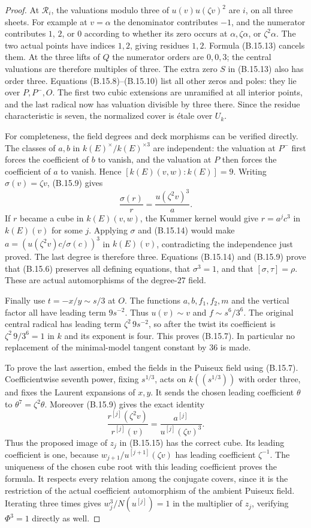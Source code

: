 \begin{proof}
At $\mathcal R_i$, the valuations modulo three of
$u(v)u(\zeta v)^2$ are $i$, on all three sheets.
For example at $v=\alpha$ the denominator contributes
$-1$, and the numerator contributes $1$, $2$, or $0$
according to whether its zero occurs at
$\alpha,\zeta\alpha$, or $\zeta^2\alpha$.
The two actual points have indices $1,2$, giving
residues $1,2$.  Formula (B.15.13) cancels them.
At the three lifts of $Q$ the numerator orders are
$0,0,3$; the
central valuations are therefore multiples of three.
The extra zero $S$ in (B.15.13) also has order three.
Equations (B.15.8)--(B.15.10) list all other zeros and
poles: they lie over $P,P^-,O$.  The first two cubic
extensions are unramified at all interior points, and
the last radical now has valuation divisible by three
there.  Since the residue characteristic is seven,
the normalized cover is \'etale over $U_k$.

For completeness, the field degrees and deck morphisms
can be verified directly.  The classes of $a,b$ in
$k(E)^\times/k(E)^{\times3}$ are independent: the
valuation at $P^-$ first forces the coefficient of $b$
to vanish, and the valuation at $P$ then forces the
coefficient of $a$ to vanish.  Hence $[k(E)(v,w):k(E)]=9$.
Writing $\sigma(v)=\zeta v$, (B.15.9) gives
\[
             \frac{\sigma(r)}r
                   =\frac{u(\zeta^2v)^3}{a}.              \tag{B.15.14}
\]
If $r$ became a cube in $k(E)(v,w)$, the Kummer kernel
would give $r=a^j c^3$ in $k(E)(v)$ for some $j$.
Applying $\sigma$ and (B.15.14) would make
$a=(u(\zeta^2v)c/\sigma(c))^3$ in $k(E)(v)$, contradicting
the independence just proved.  The last degree is
therefore three.
Equations (B.15.14) and (B.15.9) prove that (B.15.6)
preserves all defining equations, that $\sigma^3=1$,
and that $[\sigma,\tau]=\rho$.  These are actual
automorphisms of the degree-$27$ field.

Finally use $t=-x/y\sim s/3$ at $O$.
The functions $a,b,f_1,f_2,m$ and the vertical factor
all have leading term $9s^{-2}$.  Thus
$u(v)\sim v$ and $f\sim s^6/3^6$.
The original central radical has leading term
$\zeta^2\,9s^{-2}$, so after the twist its coefficient
is $\zeta^2\,9/3^6=1$ in $k$ and its exponent is four.
This proves (B.15.7).  In particular no replacement of
the minimal-model tangent constant by $36$ is made.

To prove the last assertion, embed the fields in the
Puiseux field using (B.15.7).  Coefficientwise seventh
power, fixing $s^{1/3}$, acts on $k((s^{1/3}))$ with
order three, and fixes the Laurent expansions of
$x,y$.  It sends the chosen leading coefficient
$\theta$ to $\theta^7=\zeta^2\theta$.
Moreover (B.15.9) gives the exact identity
\[
 \frac{r^{[j]}(\zeta^2v)}{r^{[j]}(v)}
       =\frac{a^{[j]}}{u^{[j]}(\zeta v)^3}.
\]
Thus the proposed image of $z_j$ in (B.15.15) has the
correct cube.  Its leading coefficient is one, because
$w_{j+1}/u^{[j+1]}(\zeta v)$ has leading coefficient
$\zeta^{-1}$.  The uniqueness of the chosen cube root
with this leading coefficient proves the formula.
It respects every relation among the conjugate covers,
since it is the restriction of the actual coefficient
automorphism of the ambient Puiseux field.  Iterating
three times gives $w_j^3/N(u^{[j]})=1$ in the multiplier
of $z_j$, verifying $\Phi^3=1$ directly as well.


\end{proof}
